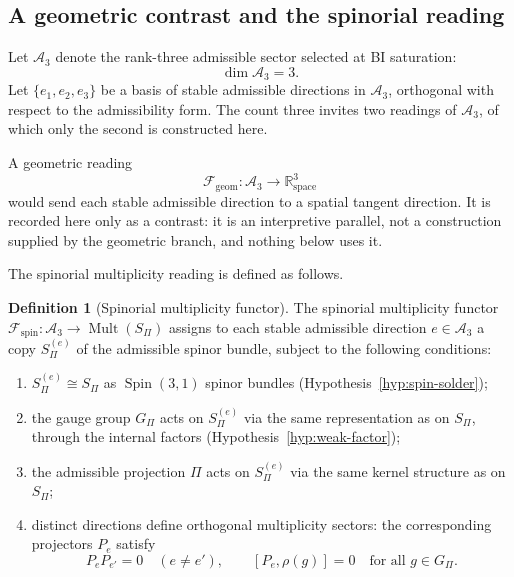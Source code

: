 \documentclass[11pt,a4paper]{article}
\theoremstyle{definition}
\newtheorem{definition}[theorem]{Definition}
\theoremstyle{remark}
\DeclareMathOperator{\Mult}{Mult}
\newcommand{\Spin}{\operatorname{Spin}}
\begin{document}
  \subsection{A geometric contrast and the spinorial reading}
    \label{ssec:two-functors}

    Let $\mathcal{A}_3$ denote the rank-three admissible sector selected at BI
    saturation:
    \begin{equation}
      \label{eq:admissible-sector}
      \dim \mathcal{A}_3 = 3 .
    \end{equation}
    Let $\{e_1, e_2, e_3\}$ be a basis of stable admissible directions in
    $\mathcal{A}_3$, orthogonal with respect to the admissibility form.
    The count three invites two readings of $\mathcal{A}_3$, of which only the second is
    constructed here.

    A geometric reading
    \begin{equation}
      \label{eq:geometric-functor}
      \mathcal{F}_{\mathrm{geom}} \colon \mathcal{A}_3 \longrightarrow
      \mathbb{R}^3_{\mathrm{space}}
    \end{equation}
    would send each stable admissible direction to a spatial tangent direction.
    It is recorded here only as a contrast: it is an interpretive parallel, not a construction
    supplied by the geometric branch, and nothing below uses it.

    The spinorial multiplicity reading is defined as follows.

    \begin{definition}[Spinorial multiplicity functor]
      \label{def:spinorial-functor}
      The spinorial multiplicity functor
      $\mathcal{F}_{\mathrm{spin}} \colon \mathcal{A}_3 \to \Mult(S_\Pi)$
      assigns to each stable admissible direction $e \in \mathcal{A}_3$ a copy
      $S_\Pi^{(e)}$ of the admissible spinor bundle, subject to the following conditions:
      \begin{enumerate}
        \item[\emph{(i)}]   $S_\Pi^{(e)} \cong S_\Pi$ as $\Spin(3,1)$ spinor bundles
        (Hypothesis~\ref{hyp:spin-solder});
        \item[\emph{(ii)}]  the gauge group $G_\Pi$ acts on $S_\Pi^{(e)}$ via the same
        representation as on $S_\Pi$, through the internal factors
        (Hypothesis~\ref{hyp:weak-factor});
        \item[\emph{(iii)}] the admissible projection $\Pi$ acts on $S_\Pi^{(e)}$ via
        the same kernel structure as on $S_\Pi$;
        \item[\emph{(iv)}]  distinct directions define orthogonal multiplicity sectors:
        the corresponding projectors $P_e$ satisfy
        \[
          P_e P_{e'} = 0 \quad (e \neq e'),
          \qquad
          [P_e, \rho(g)] = 0 \quad \text{for all } g \in G_\Pi .
        \]
      \end{enumerate}
    \end{definition}
\end{document}
